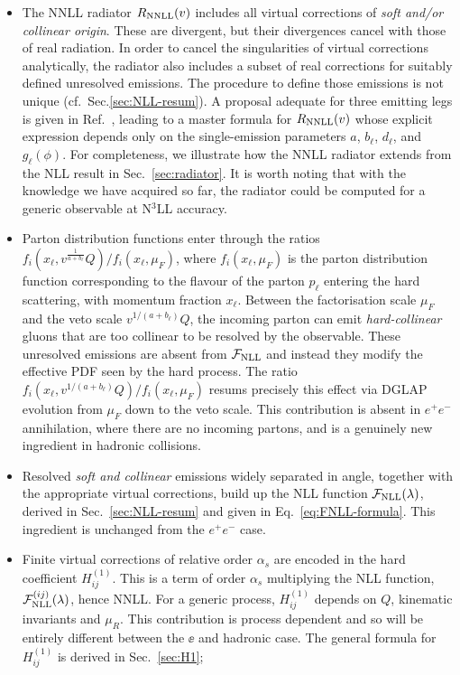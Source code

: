 \begin{itemize}
\item The NNLL radiator $R_{\rm NNLL}(v)$ includes all virtual
  corrections of \emph{soft and/or collinear origin}. These are divergent,
  but their divergences cancel with those of real radiation. In
  order to cancel the singularities of virtual corrections analytically, the
  radiator also includes a subset of real corrections for suitably
  defined unresolved emissions. The procedure to define those
  emissions is not unique (cf.\ Sec.\ref{sec:NLL-resum}). A proposal adequate for three emitting legs is given in
  Ref.~\cite{Arpino:2019ozn}, leading to a master formula for
  $R_{\rm NNLL}(v)$ whose explicit expression depends only on the
  single-emission parameters $a$, $b_\ell$, $d_\ell$, and
  $g_\ell(\phi)$. For completeness, we illustrate how
  the NNLL radiator extends from the NLL result in
  Sec.~\ref{sec:radiator}. It is worth noting that  
  with the knowledge we have acquired so far, the radiator 
  could be computed for a generic observable at N$^3$LL accuracy. 

  \item Parton distribution functions enter through the ratios
  $f_i(x_\ell,v^{\frac{1}{a+b_\ell}}Q)/f_i(x_\ell,\mu_F)$,
  where $f_i(x_\ell,\mu_F)$ is the parton distribution function
  corresponding to the flavour of the parton $p_\ell$ entering the hard scattering, with
  momentum fraction $x_\ell$. Between the factorisation scale $\mu_F$ and the veto scale
  $v^{1/(a+b_\ell)}Q$, the incoming parton can emit \emph{hard-collinear}
  gluons that are too collinear to be resolved by the observable.
  These unresolved emissions are absent from
  $\mathcal{F}_{\rm NLL}$ and instead they modify the effective PDF seen
  by the hard process. The ratio $f_i(x_\ell,v^{1/(a+b_\ell)}Q)/
  f_i(x_\ell,\mu_F)$ resums precisely this effect via DGLAP
  evolution from $\mu_F$ down to the veto scale. This contribution is absent in
  $e^+e^-$ annihilation, where there are no incoming partons, and
  is a genuinely new ingredient in hadronic collisions.

\item Resolved \emph{soft and collinear} emissions widely separated in angle,
  together with the appropriate virtual corrections, build up the
  NLL function $\mathcal{F}_{\rm NLL}(\lambda)$, derived in
  Sec.~\ref{sec:NLL-resum} and given in Eq.~\eqref{eq:FNLL-formula}.
  This ingredient is unchanged from the $e^+e^-$ case.

\item Finite virtual corrections of relative order $\alpha_s$ are
  encoded in the hard coefficient $H_{ij}^{(1)}$. This is a term of order
  $\alpha_s$ multiplying the NLL function, $\mathcal{F}^{(ij)}_{\rm NLL}(\lambda)$, 
  hence NNLL. For a generic process, $H_{ij}^{(1)}$ depends on $Q$, kinematic invariants and $\mu_R$. This contribution is process dependent and so will be entirely different between the $\ee$ and hadronic case. The general formula for $H_{ij}^{(1)}$ is derived in Sec.~\ref{sec:H1}; 
   

\end{itemize}
